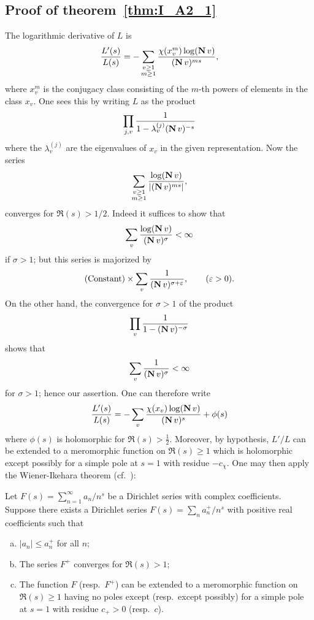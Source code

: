 \begin{subappendices}
\subsection{Proof of theorem~\ref{thm:I_A2_1}}
\label{sec:I_A3}
The logarithmic derivative of $L$ is
\[
	\frac{L'(s)}{L(s)} = -\sum_{\substack{v\ge 1 \\ m\ge 1}}
	\frac{\chi(x_v^m) \log(\operatorname{\mathbf{N}} v)}{(\operatorname{\mathbf{N}} v)^{ms}},
\]
where $x_v^m$ is the conjugacy class consisting of the $m$-th powers of
elements in the class $x_v$. One sees this by writing $L$ as the product
\[
	\prod_{j, v} \frac{1}{1 - \lambda_v^{(j)}( \operatorname{\mathbf{N}} v )^{-s}}
\]
where
\dpage
the $\lambda_v^{(j)}$ are the eigenvalues of $x_v$ in the given representation.
Now the series
\[
	\sum_{\substack{v\ge 1 \\ m\ge 1}} \frac{\log(\operatorname{\mathbf{N}} v)}{ |(\operatorname{\mathbf{N}}
	v)^{ms}| },
\]
converges for $\Re(s) > 1/2$.  Indeed it suffices to show that
\[
	\sum_v \frac{\log(\operatorname{\mathbf{N}} v)}{ (\operatorname{\mathbf{N}} v)^\sigma } < \infty
\]
if $\sigma > 1$; but this series is majorized by
\[
	\text{(Constant)} \times \sum_{v} \frac{1}{(\operatorname{\mathbf{N}} v)^{\sigma +
	\varepsilon}}, \qquad (\varepsilon > 0).
\]
On the other hand, the convergence for $\sigma > 1$ of the product
\[
	\prod_{v} \frac{1}{1 - (\operatorname{\mathbf{N}} v)^{-\sigma}}
\]
shows that
\[
	\sum_{v} \frac{1}{(\operatorname{\mathbf{N}} v)^\sigma} < \infty
\]
for $\sigma > 1$; hence our assertion. One can therefore write
\[
	\frac{L'(s)}{L(s)} = -\sum_{v} \frac{\chi(x_v) \log(\operatorname{\mathbf{N}}
	v)}{(\operatorname{\mathbf{N}} v)^s} + \phi(s)
\] 
where $\phi(s)$ is holomorphic for $\Re(s) > \frac{1}{2}$. Moreover, by
hypothesis,
\dpage
$L'/L$ can be extended to a meromorphic function on $\Re(s) \ge 1$
which is holomorphic except possibly for a simple pole at $s = 1$ with residue
$-c_\chi$. One may then apply the Wiener-Ikehara theorem (cf.\ \cite[123]{13}):
\begin{thm}
	Let $F(s) = \sum_{n=1}^\infty a_n/n^s$ be a Dirichlet series with
	complex coefficients. Suppose there exists a Dirichlet series $F(s) =
	\sum_n a_n^+/n^s$ with positive real coefficients such that
\begin{enumerate}[(a)]
	\item $|a_n| \le a_n^+$ for all $n$;
	\item The series $F^+$ converges for $\Re(s) > 1$;
	\item The function $F$ (resp.\ $F^+$) can be extended to a meromorphic
		function on $\Re(s)\ge 1$ having no poles except (resp.\ except
		possibly) for a simple pole at $s=1$ with residue $c_+ > 0$
		(resp.\ $c$).
\end{enumerate}

\end{thm}
\end{subappendices}
